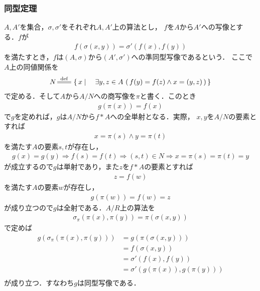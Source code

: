 \subsubsection{同型定理}
	$A,A'$を集合，$\sigma,\sigma'$をそれぞれ$A,A'$上の算法とし，
	$f$を$A$から$A'$への写像とする．$f$が
	\begin{align}
		f(\sigma(x,y)) = \sigma'(f(x),f(y))
	\end{align}
	を満たすとき，$f$は$(A,\sigma)$から$(A',\sigma')$への準同型写像であるという．
	ここで$A$上の同値関係を
	\begin{align}
		N \defeq \Set{x}{\exists y,z \in A\, 
		\left(\, f(y) = f(z) \wedge x = (y,z)\, \right)}
	\end{align}
	で定める．そして$A$から$A/N$への商写像を$\pi$と書く．このとき
	\begin{align}
		g\left(\pi(x)\right) = f(x)
	\end{align}
	で$g$を定めれば，$g$は$A/N$から$f \ast A$への全単射となる．実際，
	$x,y$を$A/N$の要素とすれば
	\begin{align}
		x = \pi(s) \wedge y = \pi(t)
	\end{align}
	を満たす$A$の要素$s,t$が存在し，
	\begin{align}
		g(x) = g(y) \Longrightarrow f(s) = f(t)
		\Longrightarrow (s,t) \in N
		\Longrightarrow x = \pi(s) = \pi(t) = y
	\end{align}
	が成立するので$g$は単射であり，また$z$を$f \ast A$の要素とすれば
	\begin{align}
		z = f(w)
	\end{align}
	を満たす$A$の要素$w$が存在し，
	\begin{align}
		g(\pi(w)) = f(w) = z
	\end{align}
	が成り立つので$g$は全射である．$A/R$上の算法を
	\begin{align}
		\sigma_\pi(\pi(x),\pi(y)) = \pi(\sigma(x,y))
	\end{align}
	で定めば
	\begin{align}
		g \left( \sigma_\pi(\pi(x),\pi(y)) \right) 
		&= g \left( \pi(\sigma(x,y)) \right) \\
		&= f \left( \sigma(x,y) \right) \\
		&= \sigma'(f(x),f(y)) \\
		&= \sigma' \left( g(\pi(x)),g(\pi(y)) \right) \\
	\end{align}
	が成り立つ．すなわち$g$は同型写像である．
	

